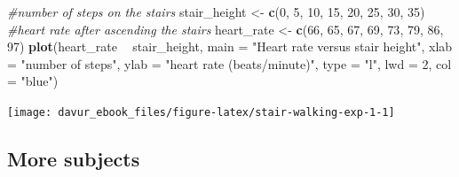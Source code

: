 \documentclass[]{book}
\newenvironment{Shaded}{\begin{snugshade}}{\end{snugshade}}
\newcommand{\CommentTok}[1]{\textcolor[rgb]{0.56,0.35,0.01}{\textit{#1}}}
\newcommand{\DataTypeTok}[1]{\textcolor[rgb]{0.13,0.29,0.53}{#1}}
\newcommand{\DecValTok}[1]{\textcolor[rgb]{0.00,0.00,0.81}{#1}}
\newcommand{\KeywordTok}[1]{\textcolor[rgb]{0.13,0.29,0.53}{\textbf{#1}}}
\newcommand{\NormalTok}[1]{#1}
\newcommand{\OperatorTok}[1]{\textcolor[rgb]{0.81,0.36,0.00}{\textbf{#1}}}
\newcommand{\StringTok}[1]{\textcolor[rgb]{0.31,0.60,0.02}{#1}}
\begin{document}
\begin{Shaded}
\begin{Highlighting}[]
\CommentTok{#number of steps on the stairs}
\NormalTok{stair_height <-}\StringTok{ }\KeywordTok{c}\NormalTok{(}\DecValTok{0}\NormalTok{, }\DecValTok{5}\NormalTok{, }\DecValTok{10}\NormalTok{, }\DecValTok{15}\NormalTok{, }\DecValTok{20}\NormalTok{, }\DecValTok{25}\NormalTok{, }\DecValTok{30}\NormalTok{, }\DecValTok{35}\NormalTok{)}
\CommentTok{#heart rate after ascending the stairs}
\NormalTok{heart_rate <-}\StringTok{ }\KeywordTok{c}\NormalTok{(}\DecValTok{66}\NormalTok{, }\DecValTok{65}\NormalTok{, }\DecValTok{67}\NormalTok{, }\DecValTok{69}\NormalTok{, }\DecValTok{73}\NormalTok{, }\DecValTok{79}\NormalTok{, }\DecValTok{86}\NormalTok{, }\DecValTok{97}\NormalTok{)}
\KeywordTok{plot}\NormalTok{(heart_rate }\OperatorTok{~}\StringTok{ }\NormalTok{stair_height,}
      \DataTypeTok{main =} \StringTok{"Heart rate versus stair height"}\NormalTok{,}
      \DataTypeTok{xlab =} \StringTok{"number of steps"}\NormalTok{,}
      \DataTypeTok{ylab =} \StringTok{"heart rate (beats/minute)"}\NormalTok{,}
      \DataTypeTok{type =} \StringTok{"l"}\NormalTok{,}
      \DataTypeTok{lwd =} \DecValTok{2}\NormalTok{,}
      \DataTypeTok{col =} \StringTok{"blue"}\NormalTok{)}
\end{Highlighting}
\end{Shaded}

\begin{center}\texttt{[image: davur\_ebook\_files/figure-latex/stair-walking-exp-1-1]} \end{center}

\hypertarget{more-subjects-1}{%
\subsection{More subjects}\label{more-subjects-1}}
\end{document}

